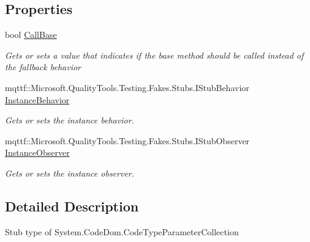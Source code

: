 \subsection*{Properties}
\begin{DoxyCompactItemize}
\item 
bool \hyperlink{class_system_1_1_code_dom_1_1_fakes_1_1_stub_code_type_parameter_collection_ae3f7d297ffd0232e828a81bb3b45f9a3}{Call\-Base}
\begin{DoxyCompactList}\small\item\em Gets or sets a value that indicates if the base method should be called instead of the fallback behavior\end{DoxyCompactList}\item 
mqttf\-::\-Microsoft.\-Quality\-Tools.\-Testing.\-Fakes.\-Stubs.\-I\-Stub\-Behavior \hyperlink{class_system_1_1_code_dom_1_1_fakes_1_1_stub_code_type_parameter_collection_a187f91eb32be04d9e7c744916cc4146e}{Instance\-Behavior}
\begin{DoxyCompactList}\small\item\em Gets or sets the instance behavior.\end{DoxyCompactList}\item 
mqttf\-::\-Microsoft.\-Quality\-Tools.\-Testing.\-Fakes.\-Stubs.\-I\-Stub\-Observer \hyperlink{class_system_1_1_code_dom_1_1_fakes_1_1_stub_code_type_parameter_collection_a1bde81aa3ded743bd7e309db93aaf5f1}{Instance\-Observer}
\begin{DoxyCompactList}\small\item\em Gets or sets the instance observer.\end{DoxyCompactList}\end{DoxyCompactItemize}


\subsection{Detailed Description}
Stub type of System.\-Code\-Dom.\-Code\-Type\-Parameter\-Collection



